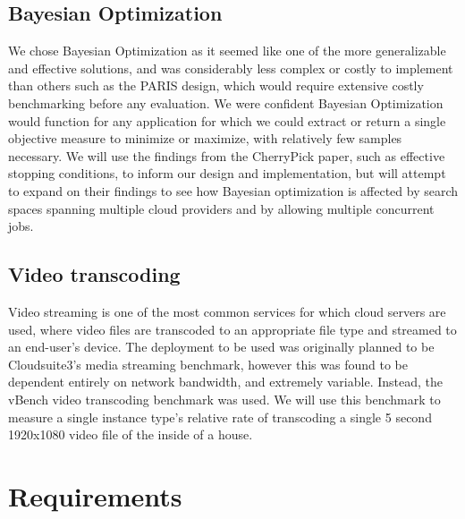 \documentclass{report}
\begin{document}
\subsection{Bayesian Optimization}
We chose Bayesian Optimization as it seemed like one of the more generalizable and effective solutions\cite{Alipourfard2017}, and was considerably less complex or costly to implement than others such as the PARIS design, which would require extensive costly benchmarking before any evaluation\cite{Yadwadkar2017}. We were confident Bayesian Optimization would function for any application for which we could extract or return a single objective measure to minimize or maximize, with relatively few samples necessary. We will use the findings from the CherryPick paper, such as effective stopping conditions, to inform our design and implementation, but will attempt to expand on their findings to see how Bayesian optimization is affected by search spaces spanning multiple cloud providers and by allowing multiple concurrent jobs.
\subsection{Video transcoding}
Video streaming is one of the most common services for which cloud servers are used, where video files are transcoded to an appropriate file type and streamed to an end-user's device\cite{JunXin2005a, Lottarini2018}.
The deployment to be used was originally planned to be Cloudsuite3's media streaming benchmark\cite{Palit2016}, however this was found to be dependent entirely on network bandwidth, and extremely variable. Instead, the vBench video transcoding benchmark was used\cite{Lottarini2018}. We will use this benchmark to measure a single instance type's relative rate of transcoding a single 5 second 1920x1080 video file of the inside of a house.
\section{Requirements}
\end{document}
